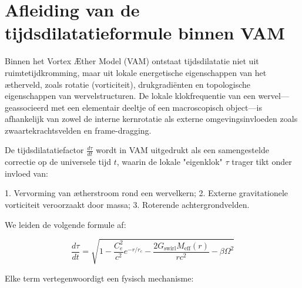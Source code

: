 
\section{Afleiding van de tijdsdilatatieformule binnen VAM}

Binnen het Vortex Æther Model (VAM) ontstaat tijdsdilatatie niet uit ruimtetijdkromming, maar uit lokale energetische eigenschappen van het ætherveld, zoals rotatie (vorticiteit), drukgradiënten en topologische eigenschappen van wervelstructuren. De lokale klokfrequentie van een wervel—geassocieerd met een elementair deeltje of een macroscopisch object—is afhankelijk van zowel de interne kernrotatie als externe omgevingsinvloeden zoals zwaartekrachtsvelden en frame-dragging.

De tijdsdilatatiefactor $\frac{d\tau}{dt}$ wordt in VAM uitgedrukt als een samengestelde correctie op de universele tijd $t$, waarin de lokale "eigenklok" $\tau$ trager tikt onder invloed van:

1. Vervorming van ætherstroom rond een wervelkern;
2. Externe gravitationele vorticiteit veroorzaakt door massa;
3. Roterende achtergrondvelden.

We leiden de volgende formule af:

\begin{equation}
\frac{d\tau}{dt} = \sqrt{1 - \frac{C_e^2}{c^2} e^{-r/r_c} - \frac{2G_{\text{swirl}} M_{\text{eff}}(r)}{r c^2} - \beta \Omega^2}
\end{equation}

Elke term vertegenwoordigt een fysisch mechanisme:


